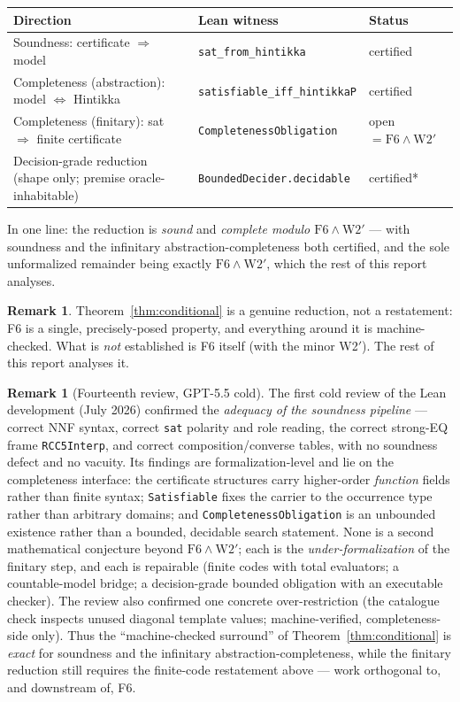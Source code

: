 \documentclass[11pt]{article}
\newcommand{\code}[1]{\texttt{#1}}
\theoremstyle{plain}
\theoremstyle{definition}
\newtheorem{remark}[theorem]{Remark}
\begin{document}
\begin{center}
\renewcommand{\arraystretch}{1.2}
\begin{tabular}{@{}lll@{}}
\toprule
Direction & Lean witness & Status\\
\midrule
Soundness: certificate $\Rightarrow$ model
  & \code{sat\_from\_hintikka} & certified\\
Completeness (abstraction): model $\Leftrightarrow$ Hintikka
  & \code{satisfiable\_iff\_hintikkaP} & certified\\
Completeness (finitary): sat $\Rightarrow$ finite certificate
  & \code{CompletenessObligation} & open $=\mathrm{F6}\wedge\mathrm{W2}'$\\
Decision-grade reduction (shape only; premise oracle-inhabitable)
  & \code{BoundedDecider.decidable} & certified*\\
\bottomrule
\end{tabular}
\end{center}

\noindent In one line: the reduction is \emph{sound} and \emph{complete
modulo $\mathrm{F6}\wedge\mathrm{W2}'$} --- with soundness and the
infinitary abstraction-completeness both certified, and the sole
unformalized remainder being exactly $\mathrm{F6}\wedge\mathrm{W2}'$,
which the rest of this report analyses.

\begin{remark}
Theorem~\ref{thm:conditional} is a genuine reduction, not a
restatement: F6 is a single, precisely-posed property, and everything
around it is machine-checked. What is \emph{not} established is F6
itself (with the minor W2$'$). The rest of this report analyses it.
\end{remark}

\begin{remark}[Fourteenth review, GPT-5.5 cold]
The first cold review of the Lean development (July 2026) confirmed the
\emph{adequacy of the soundness pipeline} --- correct NNF syntax,
correct \code{sat} polarity and role reading, the correct strong-EQ
frame \code{RCC5Interp}, and correct composition/converse tables, with
no soundness defect and no vacuity. Its findings are formalization-level
and lie on the completeness interface: the certificate structures carry
higher-order \emph{function} fields rather than finite syntax;
\code{Satisfiable} fixes the carrier to the occurrence type rather than
arbitrary domains; and \code{CompletenessObligation} is an unbounded
existence rather than a bounded, decidable search statement. None is a
second mathematical conjecture beyond $\mathrm{F6}\wedge\mathrm{W2}'$;
each is the \emph{under-formalization} of the finitary step, and each is
repairable (finite codes with total evaluators; a countable-model
bridge; a decision-grade bounded obligation with an executable checker).
The review also confirmed one concrete over-restriction (the catalogue
check inspects unused diagonal template values; machine-verified,
completeness-side only). Thus the ``machine-checked surround'' of
Theorem~\ref{thm:conditional} is \emph{exact} for soundness and the
infinitary abstraction-completeness, while the finitary reduction still
requires the finite-code restatement above --- work orthogonal to, and
downstream of, F6.
\end{remark}
\end{document}
